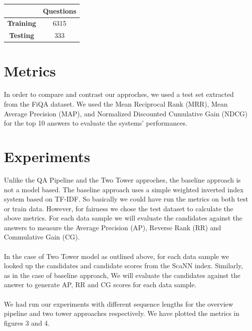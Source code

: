 \documentclass[11pt,a4paper]{article}
\begin{document}
\begin{center}
\begin{tabular}{||c c ||} 
 \hline
 \textbf{} & \textbf{Questions} \\ [0.5ex] 
 \hline\hline
 \textbf{Training} & 6315 \\ 
 \hline
 \textbf{Testing} & 333 \\
 \hline

 \hline
\end{tabular}
\end{center}

\section{Metrics}
In order to compare and contrast our approches, we used a test set extracted from the FiQA dataset. We used the Mean Reciprocal Rank (MRR), Mean Average Precision (MAP), and Normalized Discounted Cumulative Gain (NDCG) for the top 10 answers to evaluate the systems’ performances. 


\section{Experiments}
Unlike the QA Pipeline and the Two Tower approches, the baseline approach is not a model based. The baseline approach uses a simple weighted inverted index system based on TF-IDF. So basically we could have run the metrics on both test or train data. However, for fairness we chose the test dataset to calculate the above metrics. For each data sample we will evaluate the candidates against the answers to measure the Average Precision (AP), Reverse Rank (RR) and Commulative Gain (CG).

\paragraph{}
In the case of Two Tower model as outlined above, for each data sample we looked up the candidates and candidate scores from the ScaNN index. Similarly, as in the case of baseline approach, We will evaluate the candidates against the answer to generate AP, RR and CG scores for each data sample.

\paragraph{}
We had run our experiments with different sequence lengths for the overview pipeline and two tower approaches respectively. We have plotted the metrics in figures 3 and 4.
\end{document}
